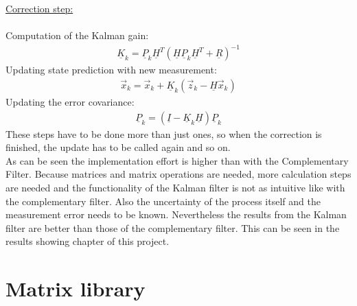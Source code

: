 \underline{Correction step:}\\\\
Computation of the Kalman gain:
\begin{align}
\underline{K}_k = \underline{P}_k	\underline{H}^T(\underline{H}\underline{P}_k\underline{H}^T+\underline{R})^{-1}
\label{equ:Kalman3}
\end{align}
Updating state prediction with new measurement:
\begin{align}
\vec x_k = 	\vec x_k+\underline{K}_k(\vec z_k-\underline{H}\vec x_k)
\label{equ:Kalman4}
\end{align}
Updating the error covariance:
\begin{align}
\underline{P}_k = (\underline{I}-\underline{K}_k\underline{H})\underline{P}_k	
\label{equ:Kalman5}
\end{align}
These steps have to be done more than just ones, so when the correction is finished, the update has to be called again and so on.\\
As can be seen the implementation effort is higher than with the Complementary Filter. Because matrices and matrix operations are needed, more calculation steps are needed and the functionality of the Kalman filter is not as intuitive like with the complementary filter. Also the uncertainty of the process itself and the measurement error needs to be known. Nevertheless the results from the Kalman filter are better than those of the complementary filter. This can be seen in the results showing chapter of this project.

\section{Matrix library}
\label{sec:MatrixLib}

